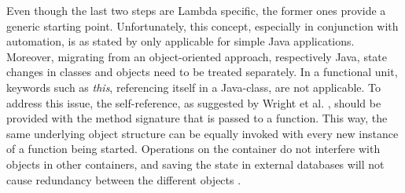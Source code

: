 \documentclass[11pt]{article}
\begin{document}
Even though the last two steps are Lambda specific, the former ones provide a generic starting point. Unfortunately, this concept, especially in conjunction with automation, is as stated by \cite{spillner2017Java} only applicable for simple Java applications. Moreover, migrating from an object-oriented approach, respectively Java, state changes in classes and objects need to be treated separately. In a functional unit, keywords such as \textit{this}, referencing itself in a Java-class, are not applicable. To address this issue, the self-reference, as suggested by Wright et al. \cite{wright1998compiling}, should be provided with the method signature that is passed to a function. This way, the same underlying object structure can be equally invoked with every new instance of a function being started. Operations on the container do not interfere with objects in other containers, and saving the state in external databases will not cause redundancy between the different objects \cite{spillner2017Java}.\\\\ 
\end{document}
